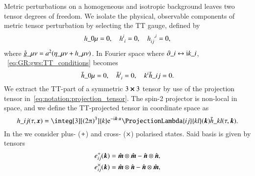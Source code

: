Metric perturbations on a homogeneous and isotropic background leaves two tensor degrees of freedom. %
We isolate the physical, observable components of metric tensor perturbation by selecting the TT gauge, %
defined by
\begin{equation}\label{eq:GR:gws:TT_conditions}
    h\_{0\mu} = 0, \quad h\indices{^i_i} = 0, \quad h\indices{_{ij}^{,i}}=0,
\end{equation}
where $\pert{g}\_{\mu\nu}= a^2 (\eta\_{\mu\nu}+h\_{\mu\nu})$. In Fourier space where $\partial\_i \leftrightarrow \mathrm{i} k\_i $, ~\cref{eq:GR:gws:TT_conditions} becomes
\begin{equation}\label{eq:GR:gws:TT_conditions_Ft}
    \Ft{h}\_{0\mu} = 0, \quad \Ft{h}\indices{^i_i} = 0, \quad k\^i \Ft{h}\_{ij}=0.
\end{equation}
We extract the TT-part of a symmetric $3\cross 3$ tensor by use of the projection tensor in~\cref{eq:notation:projection_tensor}. %
The spin-2 projector is non-local in space, and we define the TT-projected tensor in coordinate space as
\begin{equation}
    h\_{ij}(\tau, \vec{x}) = \integ[3][(2\ppi)^3]{k}  \eu[-\im \vec{k}\cdot \vec{x}] \ProjectionLambda{ij}{kl}(\vec{k}) \Ft{h}\_{kl}(\tau, \vec{k}). %
\end{equation}
In the  we consider plus- ($+$) and cross- ($\times$) polarised states. Said basis is given by tensors~\citep{maggioreGravitationalWavesVol2007}
\begin{equation}
    \begin{split}
        e^+_{ij}  (\vec{k}) &= \mhat \otimes \mhat - \nhat \otimes \nhat,\\%
        e^\times_{ij} (\vec{k}) &= \mhat \otimes \nhat - \nhat \otimes \mhat,
    \end{split}
\end{equation}
